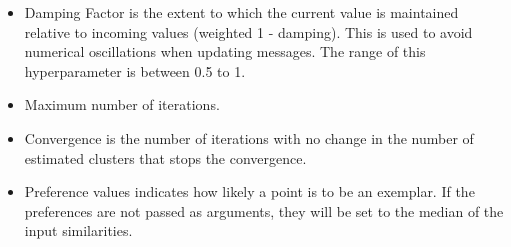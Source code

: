 \begin{itemize}

\item Damping Factor is the extent to which the current value is maintained relative to incoming values (weighted 1 - damping). This is used to avoid numerical oscillations when updating messages. The range of this hyperparameter is between 0.5 to 1.

\item Maximum number of iterations.

\item Convergence is the number of iterations with no change in the number of estimated clusters that stops the convergence.

\item Preference values indicates how likely a point is to be an exemplar. If the preferences are not passed as arguments, they will be set to the median of the input similarities.


\end{itemize}

